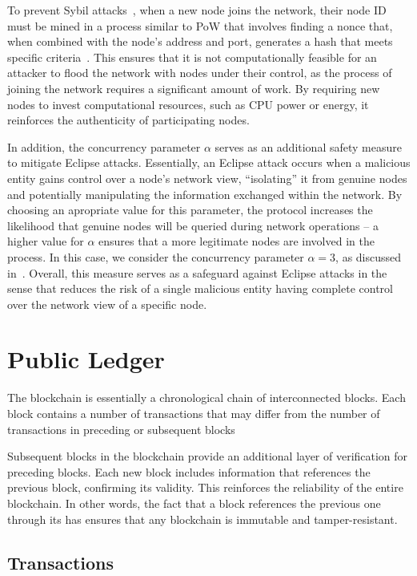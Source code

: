 \documentclass[a4paper, 11pt]{article}
\begin{document}
To prevent Sybil attacks~\cite{douceur2002sybil}, when a new node joins the network, their 
node ID must be mined in a process similar to \acs{PoW} that involves finding a nonce that, when 
combined with the node's address and port, generates a hash that meets specific criteria~\cite{pecori2016s}. 
This ensures that it is not computationally feasible for an attacker to flood the network with nodes under their control, 
as the process of joining the network requires a significant amount of work.
By requiring new nodes to invest computational resources, such as CPU power or energy, it
reinforces the authenticity of participating nodes.

In addition, the concurrency parameter $\alpha$ serves as an additional safety measure to mitigate Eclipse attacks.
Essentially, an Eclipse attack occurs when a malicious entity gains control over a node's network view, ``isolating'' it 
from genuine nodes and potentially manipulating the information exchanged within the network.
By choosing an apropriate value for this parameter, the protocol increases the likelihood that genuine 
nodes will be queried during network operations -- a higher value for $\alpha$ ensures that a more legitimate 
nodes are involved in the process. In this case, we consider the concurrency parameter $\alpha = 3$, as discussed 
in~\cite{maymounkov2002kademlia}.
Overall, this measure serves as a safeguard against Eclipse attacks in the sense that reduces the risk of a single 
malicious entity having complete control over the network view of a specific node.

\section{Public Ledger}\label{sec:ledger}

The blockchain is essentially a chronological chain of interconnected blocks. 
Each block contains a number of transactions that may differ from the number of 
transactions in preceding or subsequent blocks

Subsequent blocks in the blockchain provide an additional layer of verification for preceding blocks. 
Each new block includes information that references the previous block, confirming its validity. 
This reinforces the reliability of the entire blockchain.
In other words, the fact that a block references the previous one through its has ensures that any 
blockchain is immutable and tamper-resistant.

\subsection{Transactions}
\end{document}
